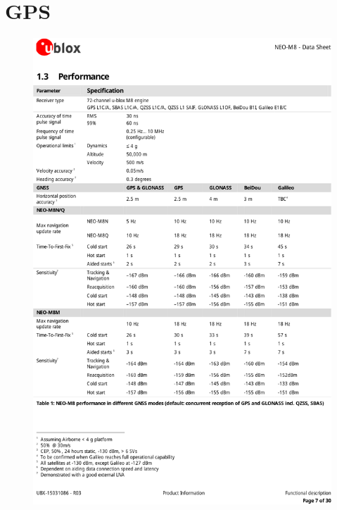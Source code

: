 \section{GPS}
\begin{figure}[H]
\centering
\includegraphics[width=\textwidth]{gps_1.pdf}
\end{figure}

\newpage

